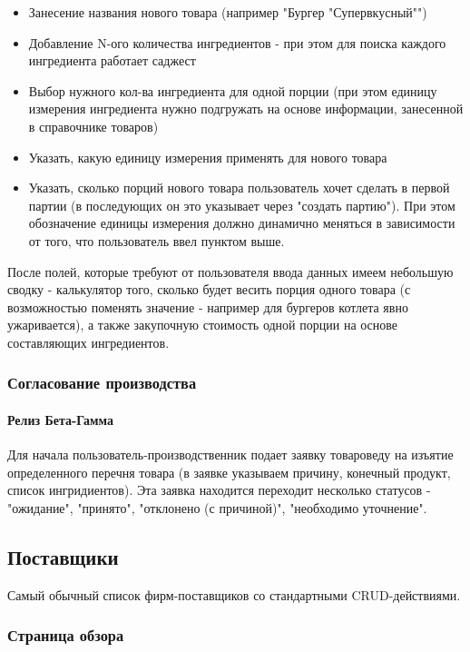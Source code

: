 \documentclass[DIV=calc, paper=a4, fontsize=11pt]{scrartcl} %
\begin{document}
\begin{itemize}
	\item Занесение названия нового товара (например "Бургер "Супервкусный"")
	\item Добавление N-ого количества ингредиентов - при этом для поиска каждого ингредиента работает саджест
	\item Выбор нужного кол-ва ингредиента для одной порции (при этом единицу измерения ингредиента нужно подгружать на основе информации, занесенной в справочнике товаров)
	\item Указать, какую единицу измерения применять для нового товара
	\item Указать, сколько порций нового товара пользователь хочет сделать в первой партии (в последующих он это указывает через "создать партию"). При этом обозначение единицы измерения должно динамично меняться в зависимости от того, что пользователь ввел пунктом выше.
\end{itemize}

После полей, которые требуют от пользователя ввода данных имеем небольшую сводку - калькулятор того, сколько будет весить порция одного товара (с возможностью поменять значение - например для бургеров котлета явно ужаривается), а также закупочную стоимость одной порции на основе составляющих ингредиентов.

\subsubsection{Согласование производства}

\paragraph{Релиз Бета-Гамма}
Для начала пользователь-производственник подает заявку товароведу на изъятие определенного перечня товара (в заявке указываем причину, конечный продукт, список ингридиентов). Эта заявка находится переходит несколько статусов - "ожидание", "принято", "отклонено (с причиной)", "необходимо уточнение".

\subsection{Поставщики}

Самый обычный список фирм-поставщиков со стандартными CRUD-действиями.

\subsubsection{Страница обзора}
\end{document}
